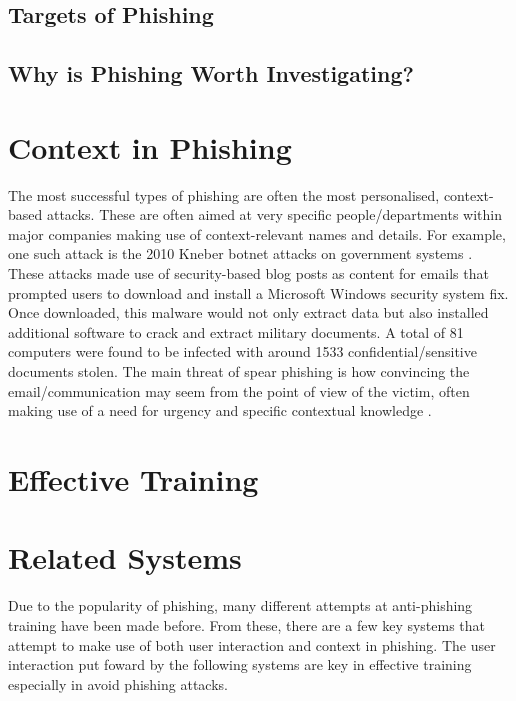 \documentclass{l4proj}
\begin{document}
\subsection{Targets of Phishing}

\subsection{Why is Phishing Worth Investigating?}

\section{Context in Phishing}

The most successful types of phishing are often the most personalised, context-based attacks. These are often aimed at very specific people/departments within major companies making use of context-relevant names and details. For example, one such attack is the 2010 Kneber botnet attacks on government systems \citep{villeneuve2010kneber}. These attacks made use of security-based blog posts as content for emails that prompted users to download and install a Microsoft Windows security system fix. Once downloaded, this malware would not only extract data but also installed additional software to crack and extract military documents. A total of 81 computers were found to be infected with around 1533 confidential/sensitive documents stolen. The main threat of spear phishing is how convincing the email/communication may seem from the point of view of the victim, often making use of a need for urgency and specific contextual knowledge \citep{nicho2018evaluating}.


\section{Effective Training}


\section{Related Systems}
Due to the popularity of phishing, many different attempts at anti-phishing training have been made before. From these, there are a few key systems that attempt to make use of both user interaction and context in phishing. The user interaction put foward by the following systems are key in effective training especially in avoid phishing attacks.
\end{document}
